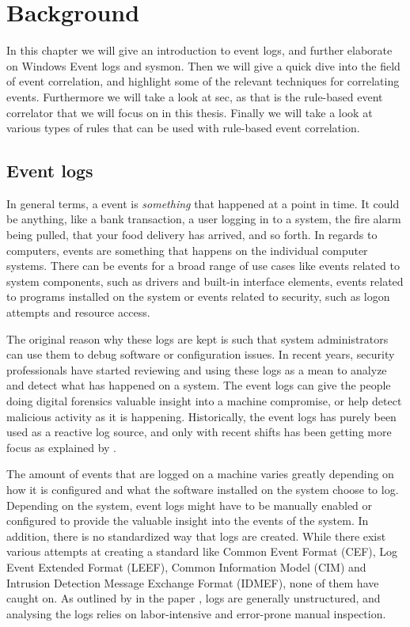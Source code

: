 \chapter{Background}
\label{chap:background}

In this chapter we will give an introduction to event logs, and further elaborate on Windows Event logs and \acrfull{sysmon}.
Then we will give a quick dive into the field of event correlation, and highlight some of the relevant techniques for correlating events.
Furthermore we will take a look at \acrfull{sec}, as that is the rule-based event correlator that we will focus on in this thesis.
Finally we will take a look at various types of rules that can be used with rule-based event correlation.

\section{Event logs}
\label{sec:event-logs}
In general terms, a event is \textit{something} that happened at a point in time. It could be anything, like a bank transaction, a user logging in to a system, the fire alarm being pulled, that your food delivery has arrived, and so forth.
In regards to computers, events are something that happens on the individual computer systems. There can be events for a broad range of use cases like events related to system components, such as drivers and built-in interface elements, events related to programs installed on the system or events related to security, such as logon attempts and resource access.

The original reason why these logs are kept is such that system administrators can use them to debug software or configuration issues. In recent years, security professionals have started reviewing and using these logs as a mean to analyze and detect what has happened on a system. The event logs can give the people doing digital forensics valuable insight into a machine compromise, or help detect malicious activity as it is happening. Historically, the event logs has purely been used as a reactive log source, and only with recent shifts has been getting more focus as explained by \textcite{He_2017}.

The amount of events that are logged on a machine varies greatly depending on how it is configured and what the software installed on the system choose to log. Depending on the system, event logs might have to be manually enabled or configured to provide the valuable insight into the events of the system.
In addition, there is no standardized way that logs are created. While there exist various attempts at creating a standard like Common Event Format (CEF)\cite{CEF}, Log Event Extended Format (LEEF)\cite{LEEF}, Common Information Model (CIM)\cite{CIM} and Intrusion Detection Message Exchange Format (IDMEF)\cite{IDMEF}, none of them have caught on. As outlined by \textcite{He_2018} in the paper , logs are generally unstructured, and analysing the logs relies on labor-intensive and error-prone manual inspection.


